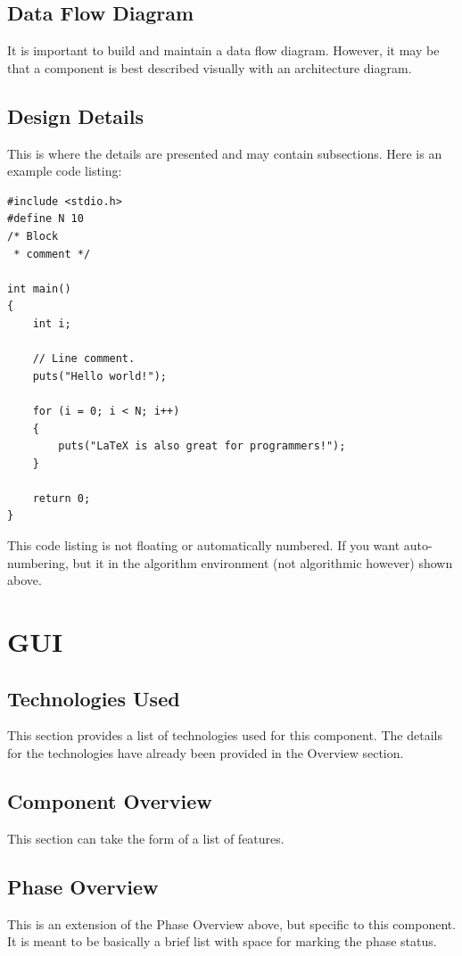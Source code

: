 \subsection{Data Flow Diagram}
It is important to build and maintain a data flow diagram.  However, it may be 
that a component is best described visually with an architecture diagram. 


\subsection{Design Details}
This is where the details are presented and may contain subsections.   Here is an example code listing:
\begin{lstlisting}
#include <stdio.h>
#define N 10
/* Block
 * comment */
 
int main()
{
    int i;
 
    // Line comment.
    puts("Hello world!");
 
    for (i = 0; i < N; i++)
    {
        puts("LaTeX is also great for programmers!");
    }
 
    return 0;
}
\end{lstlisting}
This code listing is not floating or automatically numbered.  If you want auto-numbering, but it in the algorithm environment (not algorithmic however) shown above.



\section{GUI}

\subsection{Technologies  Used}
This section provides a list of technologies used for this component.  The details 
for the technologies have already been provided in the Overview section. 

\subsection{Component  Overview}
This section can take the form of a list of features. 

\subsection{Phase Overview}
This is an extension of the Phase Overview above, but specific to this component. 
 It is meant to be basically a brief list with space for marking the phase status. 

